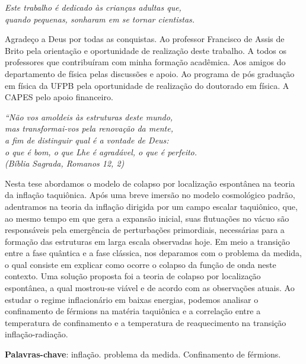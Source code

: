 \documentclass[
	12pt,				%
	openright,			%
	oneside,			%
	a4paper,			%
	english,			%
	french,				%
	spanish,			%
	brazil				%
	]{abntex2}
\begin{document}
\begin{dedicatoria}
   \vspace*{\fill}
   \centering
   \noindent
   \textit{ Este trabalho é dedicado às crianças adultas que,\\
   quando pequenas, sonharam em se tornar cientistas.} \vspace*{\fill}
\end{dedicatoria}

\begin{agradecimentos}

Agradeço a Deus por todas as conquistas. Ao professor Francisco de Assis de Brito pela orientação e oportunidade de realização deste trabalho. A todos os professores que contribuíram com minha formação acadêmica. Aos amigos do departamento de física pelas discussões e apoio. Ao programa de pós graduação em física da UFPB pela oportunidade de realização do doutorado em física. A CAPES pelo apoio financeiro.

\end{agradecimentos}

\begin{epigrafe}
    \vspace*{\fill}
	\begin{flushright}
		\textit{``Não vos amoldeis às estruturas deste mundo, \\
		mas transformai-vos pela renovação da mente, \\
		a fim de distinguir qual é a vontade de Deus: \\
		o que é bom, o que Lhe é agradável, o que é perfeito.\\
		(Bíblia Sagrada, Romanos 12, 2)}
	\end{flushright}
\end{epigrafe}


\setlength{\absparsep}{18pt} %
\begin{resumo}
 Nesta tese abordamos o modelo de colapso por localização espontânea na teoria da inflação taquiônica. Após uma breve imersão no modelo cosmológico padrão, adentramos na teoria da inflação dirigida por um campo escalar taquiônico, que, ao mesmo tempo em que gera a expansão inicial, suas flutuações no vácuo são responsáveis pela emergência de perturbações primordiais, necessárias para a formação das estruturas em larga escala observadas hoje. Em meio a transição entre a fase quântica e a fase clássica, nos deparamos com o problema da medida, o qual consiste em explicar como ocorre o colapso da função de onda neste contexto. Uma solução proposta foi a teoria de colapso por localização espontânea, a qual mostrou-se viável e de acordo com as observações atuais. Ao estudar o regime inflacionário em baixas energias, podemos analisar o confinamento de férmions na matéria taquiônica e a correlação entre a temperatura de confinamento e a temperatura de reaquecimento na transição inflação-radiação. 

 \textbf{Palavras-chave}: inflação. problema da medida. Confinamento de férmions.
\end{resumo}
\end{document}
